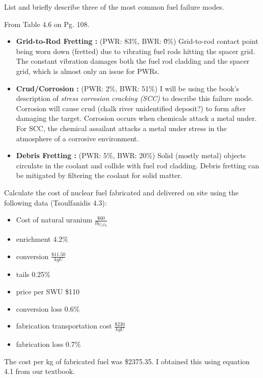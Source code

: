 \documentclass[11pt,answers,addpoints]{exam}
\begin{document}
\begin{questions}
        \question[20] List and briefly describe three of the most common fuel 
        failure modes.
        \begin{solution}
        From Table 4.6 on Pg. 108.

                \begin{itemize}
                        \item \textbf{Grid-to-Rod Fretting : } (PWR: 83\%, BWR: \~0\%) Grid-to-rod contact point being worn down (fretted) due to vibrating fuel rods hitting the spacer grid. The constant vibration damages both the fuel rod cladding and the spacer grid, which is almost only an issue for PWRs.
                        \item \textbf{Crud/Corrosion : } (PWR: 2\%, BWR: 51\%) I will be using the book's description of {\it stress corrosion cracking (SCC)} to describe this failure mode. Corrosion will cause crud (chalk river unidentified deposit?) to form after damaging the target. Corrosion occurs when chemicals attack a metal under. For SCC, the chemical assailant attacks a metal under stress in the atmosphere of a corrosive environment.
                        \item \textbf{Debris Fretting : } (PWR: 5\%, BWR: 20\%) Solid (mostly metal) objects circulate in the coolant and collide with fuel rod cladding. Debris fretting can be mitigated by filtering the coolant for solid matter.
                \end{itemize}
        \end{solution}

        \question[40] Calculate the cost of nuclear fuel fabricated and 
        delivered on site using the following data (Tsoulfanidis 4.3):
        \begin{itemize}
                \item Cost of natural uranium $\frac{\$60}{lb_{U_3O_8}}$ 
                \item enrichment 4.2\%
                \item conversion $\frac{\$11.50}{kgU}$
                \item tails 0.25\%
                \item price per SWU \$110
                \item conversion loss 0.6\%
                \item fabrication transportation cost $\frac{\$230}{kgU}$
                \item fabrication loss 0.7\%
        \end{itemize}
        \begin{solution}
                The cost per kg of fabricated fuel was \$2375.35. I obtained this using equation 4.1 from our textbook. \checked


\end{solution}
\end{questions}
\end{document}
